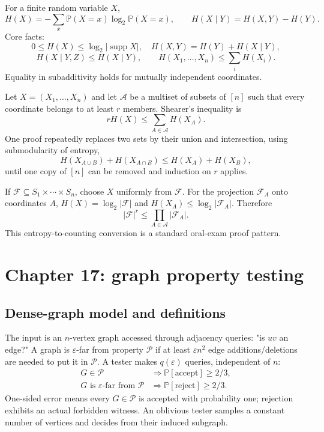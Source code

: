 \documentclass[10pt]{article}
\newcommand{\Prb}{\mathbb P}
\newcommand{\1}{\mathbf 1}
\begin{document}
For a finite random variable $X$,
\[
 H(X)=-\sum_x\Prb(X=x)\log_2\Prb(X=x),\qquad
 H(X\mid Y)=H(X,Y)-H(Y).
\]
Core facts:
\[
 0\leq H(X)\leq\log_2|\operatorname{supp}X|,
\quad H(X,Y)=H(Y)+H(X\mid Y),
\]
\[
 H(X\mid Y,Z)\leq H(X\mid Y),
\qquad
 H(X_1,\ldots,X_n)\leq\sum_iH(X_i).
\]
Equality in subadditivity holds for mutually independent coordinates.

Let $X=(X_1,\ldots,X_n)$ and let $\mathcal A$ be a multiset of subsets of
$[n]$ such that every coordinate belongs to at least $r$ members.  Shearer's
inequality is
\[
 rH(X)\leq\sum_{A\in\mathcal A}H(X_A).                 \tag{Shearer}
\]
One proof repeatedly replaces two sets by their union and intersection, using
submodularity of entropy,
\[
 H(X_{A\cup B})+H(X_{A\cap B})
 \leq H(X_A)+H(X_B),
\]
until one copy of $[n]$ can be removed and induction on $r$ applies.

If $\mathcal F\subseteq S_1\times\cdots\times S_n$, choose $X$ uniformly from
$\mathcal F$.  For the projection $\mathcal F_A$ onto coordinates $A$,
$H(X)=\log_2|\mathcal F|$ and $H(X_A)\leq\log_2|\mathcal F_A|$.  Therefore
\[
 |\mathcal F|^r\leq\prod_{A\in\mathcal A}|\mathcal F_A|.
\]
This entropy-to-counting conversion is a standard oral-exam proof pattern.

\section{Chapter 17: graph property testing}
\begingroup
\small

\subsection{Dense-graph model and definitions}

The input is an $n$-vertex graph accessed through adjacency queries:
"is $uv$ an edge?"  A graph is $\varepsilon$-far from property $\mathcal P$
if at least $\varepsilon n^2$ edge additions/deletions are needed to put it in
$\mathcal P$.  A tester makes $q(\varepsilon)$ queries, independent of $n$:
\[
\begin{array}{ll}
G\in\mathcal P &\Longrightarrow \Prb[\text{accept}]\geq2/3,\\
G\text{ is }\varepsilon\text{-far from }\mathcal P
 &\Longrightarrow \Prb[\text{reject}]\geq2/3.
\end{array}
\]
One-sided error means every $G\in\mathcal P$ is accepted with probability one;
rejection exhibits an actual forbidden witness.  An oblivious tester samples a
constant number of vertices and decides from their induced subgraph.
\end{document}
